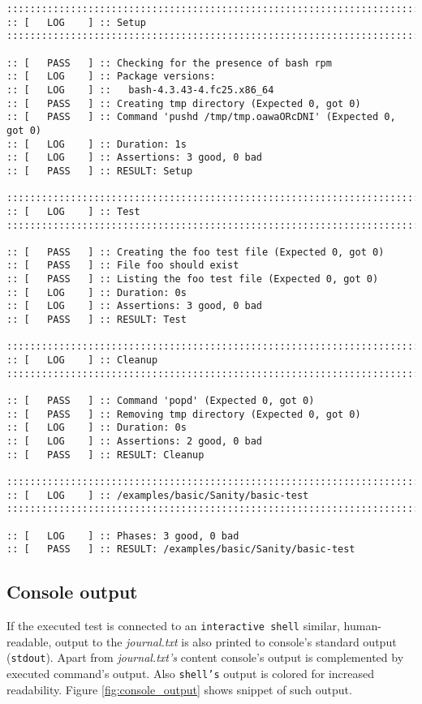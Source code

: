 \begin{lstlisting}[style=txt,caption={Example of journal.txt},label={lst:journaltxt_example}]
::::::::::::::::::::::::::::::::::::::::::::::::::::::::::::::::::::::::::::::::
:: [   LOG    ] :: Setup
::::::::::::::::::::::::::::::::::::::::::::::::::::::::::::::::::::::::::::::::

:: [   PASS   ] :: Checking for the presence of bash rpm
:: [   LOG    ] :: Package versions:
:: [   LOG    ] ::   bash-4.3.43-4.fc25.x86_64
:: [   PASS   ] :: Creating tmp directory (Expected 0, got 0)
:: [   PASS   ] :: Command 'pushd /tmp/tmp.oawaORcDNI' (Expected 0, got 0)
:: [   LOG    ] :: Duration: 1s
:: [   LOG    ] :: Assertions: 3 good, 0 bad
:: [   PASS   ] :: RESULT: Setup

::::::::::::::::::::::::::::::::::::::::::::::::::::::::::::::::::::::::::::::::
:: [   LOG    ] :: Test
::::::::::::::::::::::::::::::::::::::::::::::::::::::::::::::::::::::::::::::::

:: [   PASS   ] :: Creating the foo test file (Expected 0, got 0)
:: [   PASS   ] :: File foo should exist
:: [   PASS   ] :: Listing the foo test file (Expected 0, got 0)
:: [   LOG    ] :: Duration: 0s
:: [   LOG    ] :: Assertions: 3 good, 0 bad
:: [   PASS   ] :: RESULT: Test

::::::::::::::::::::::::::::::::::::::::::::::::::::::::::::::::::::::::::::::::
:: [   LOG    ] :: Cleanup
::::::::::::::::::::::::::::::::::::::::::::::::::::::::::::::::::::::::::::::::

:: [   PASS   ] :: Command 'popd' (Expected 0, got 0)
:: [   PASS   ] :: Removing tmp directory (Expected 0, got 0)
:: [   LOG    ] :: Duration: 0s
:: [   LOG    ] :: Assertions: 2 good, 0 bad
:: [   PASS   ] :: RESULT: Cleanup

::::::::::::::::::::::::::::::::::::::::::::::::::::::::::::::::::::::::::::::::
:: [   LOG    ] :: /examples/basic/Sanity/basic-test
::::::::::::::::::::::::::::::::::::::::::::::::::::::::::::::::::::::::::::::::

:: [   LOG    ] :: Phases: 3 good, 0 bad
:: [   PASS   ] :: RESULT: /examples/basic/Sanity/basic-test
\end{lstlisting}

\subsection{Console output}
\label{console_out}
If the executed test is connected to an \texttt{interactive shell} similar, human-readable, output to the \textit{journal.txt} is also printed to console's standard output (\texttt{stdout}). Apart from  \textit{journal.txt's} content console's output is complemented by executed command's output. Also \texttt{shell's} output is colored for increased readability.  Figure \ref{fig:console_output} shows snippet of such output.

